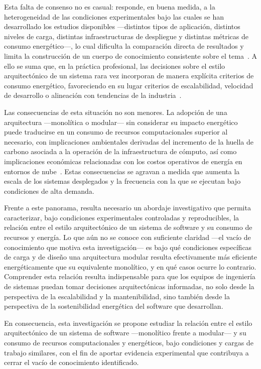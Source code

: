 Esta falta de consenso no es casual: responde, en buena medida, a la heterogeneidad de las condiciones experimentales bajo las cuales se han desarrollado los estudios disponibles ---distintos tipos de aplicación, distintos niveles de carga, distintas infraestructuras de despliegue y distintas métricas de consumo energético---, lo cual dificulta la comparación directa de resultados y limita la construcción de un cuerpo de conocimiento consistente sobre el tema~\cite{araujo2024energy}. A ello se suma que, en la práctica profesional, las decisiones sobre el estilo arquitectónico de un sistema rara vez incorporan de manera explícita criterios de consumo energético, favoreciendo en su lugar criterios de escalabilidad, velocidad de desarrollo o alineación con tendencias de la industria~\cite{khan2020cloud}.

Las consecuencias de esta situación no son menores. La adopción de una arquitectura ---monolítica o modular--- sin considerar su impacto energético puede traducirse en un consumo de recursos computacionales superior al necesario, con implicaciones ambientales derivadas del incremento de la huella de carbono asociada a la operación de la infraestructura de cómputo, así como implicaciones económicas relacionadas con los costos operativos de energía en entornos de nube~\cite{marimuthu2017green}. Estas consecuencias se agravan a medida que aumenta la escala de los sistemas desplegados y la frecuencia con la que se ejecutan bajo condiciones de alta demanda.

Frente a este panorama, resulta necesario un abordaje investigativo que permita caracterizar, bajo condiciones experimentales controladas y reproducibles, la relación entre el estilo arquitectónico de un sistema de software y su consumo de recursos y energía. Lo que aún no se conoce con suficiente claridad ---el vacío de conocimiento que motiva esta investigación--- es bajo qué condiciones específicas de carga y de diseño una arquitectura modular resulta efectivamente más eficiente energéticamente que su equivalente monolítico, y en qué casos ocurre lo contrario. Comprender esta relación resulta indispensable para que los equipos de ingeniería de sistemas puedan tomar decisiones arquitectónicas informadas, no solo desde la perspectiva de la escalabilidad y la mantenibilidad, sino también desde la perspectiva de la sostenibilidad energética del software que desarrollan.

En consecuencia, esta investigación se propone estudiar la relación entre el estilo arquitectónico de un sistema de software ---monolítico frente a modular--- y su consumo de recursos computacionales y energéticos, bajo condiciones y cargas de trabajo similares, con el fin de aportar evidencia experimental que contribuya a cerrar el vacío de conocimiento identificado.

